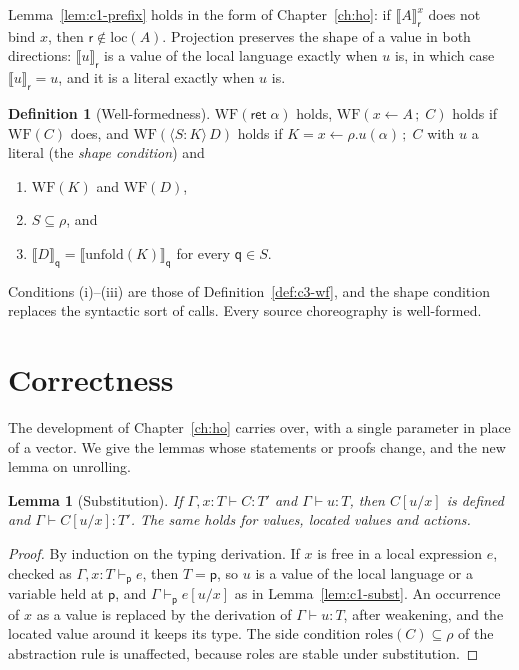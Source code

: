 \documentclass[11pt]{report}
\theoremstyle{plain}
\newtheorem{lemma}[theorem]{Lemma}
\theoremstyle{definition}
\newtheorem{definition}[theorem]{Definition}
\theoremstyle{remark}
\newcommand{\kw}[1]{\mathsf{#1}}
\newcommand{\pp}{\mathsf{p}}
\newcommand{\qq}{\mathsf{q}}
\newcommand{\rr}{\mathsf{r}}
\newcommand{\bind}[3]{#1 \leftarrow #2\,;\;#3}
\newcommand{\cret}[1]{\kw{ret}\;#1}
\newcommand{\rt}[3]{\langle #1 : #2\rangle\,#3}
\newcommand{\unfold}[1]{\mathrm{unfold}(#1)}
\newcommand{\roles}[1]{\mathrm{roles}(#1)}
\newcommand{\loc}[1]{\mathrm{loc}(#1)}
\newcommand{\WF}{\mathrm{WF}}
\newcommand{\proj}[2]{\llbracket #1 \rrbracket_{#2}}
\newcommand{\pre}[3]{\llbracket #1 \rrbracket^{#2}_{#3}}
\begin{document}
Lemma~\ref{lem:c1-prefix} holds in the form of Chapter~\ref{ch:ho}: if
$\pre{A}{x}{\rr}$ does not bind $x$, then $\rr\notin\loc{A}$.  Projection
preserves the shape of a value in both directions: $\proj{u}{\rr}$ is a value
of the local language exactly when $u$ is, in which case
$\proj{u}{\rr}=u$, and it is a literal exactly when $u$ is.

\begin{definition}[Well-formedness]\label{def:c5-wf}
  $\WF(\cret{\alpha})$ holds, $\WF(\bind{x}{A}{C})$ holds if $\WF(C)$ does,
  and $\WF(\rt{S}{K}{D})$ holds if $K=\bind{x}{\rho.u(\alpha)}{C}$ with $u$
  a literal (the \emph{shape condition}) and
  \begin{enumerate}[label=(\roman*),nosep]
  \item $\WF(K)$ and $\WF(D)$,
  \item $S\subseteq\rho$, and
  \item $\proj{D}{\qq}=\proj{\unfold{K}}{\qq}$ for every $\qq\in S$.
  \end{enumerate}
\end{definition}

Conditions (i)--(iii) are those of Definition~\ref{def:c3-wf}, and the shape
condition replaces the syntactic sort of calls.  Every source choreography
is well-formed.

\section{Correctness}
\label{sec:c5-correct}

The development of Chapter~\ref{ch:ho} carries over, with a single
parameter in place of a vector.  We give the lemmas whose statements or
proofs change, and the new lemma on unrolling.

\begin{lemma}[Substitution]\label{lem:c5-subst}
  If $\Gamma,x{:}T\vdash C:T'$ and $\Gamma\vdash u:T$, then $C[u/x]$ is
  defined and $\Gamma\vdash C[u/x]:T'$.  The same holds for values, located
  values and actions.
\end{lemma}
\begin{proof}
  By induction on the typing derivation.  If $x$ is free in a local
  expression $e$, checked as $\Gamma,x{:}T\vdash_\pp e$, then $T=\pp$, so $u$
  is a value of the local language or a variable held at $\pp$, and
  $\Gamma\vdash_\pp e[u/x]$ as in Lemma~\ref{lem:c1-subst}.  An occurrence
  of $x$ as a value is replaced by the derivation of $\Gamma\vdash u:T$,
  after weakening, and the located value around it keeps its type.  The side
  condition $\roles{C}\subseteq\rho$ of the abstraction rule is unaffected,
  because roles are stable under substitution.
\end{proof}
\end{document}

